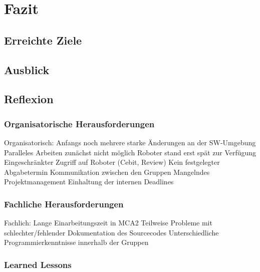 
\chapter{Fazit}

\section{Erreichte Ziele}
\authorsection{\editordummy}

\section{Ausblick}
\authorsection{\editordummy}

\section{Reflexion}
\authorsection{\editordummy}

\subsection{Organisatorische Herausforderungen}
    Organisatorisch:
        Anfangs noch mehrere starke Änderungen an der SW-Umgebung
        Paralleles Arbeiten zunächst nicht möglich
        Roboter stand erst spät zur Verfügung
        Eingeschränkter Zugriff auf Roboter (Cebit, Review)
        Kein festgelegter Abgabetermin
        Kommunikation zwischen den Gruppen
        Mangelndes Projektmanagement
        Einhaltung der internen Deadlines
\subsection{Fachliche Herausforderungen}
    Fachlich:
        Lange Einarbeitungszeit in MCA2
        Teilweise Probleme mit schlechter/fehlender Dokumentation des Sourcecodes
        Unterschiedliche Programmierkenntnisse innerhalb der Gruppen

\subsection{Learned Lessons}

